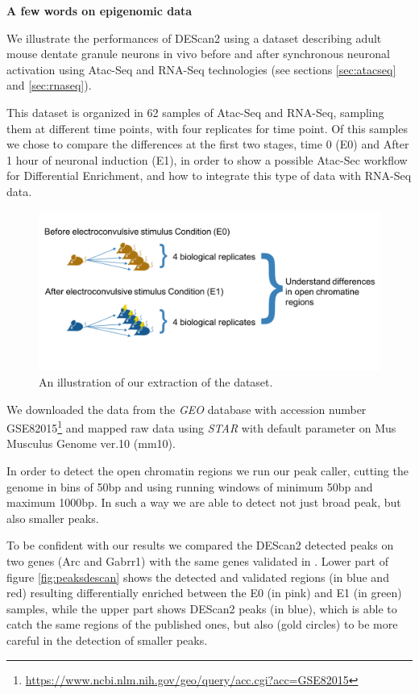 \textbf{A few words on epigenomic data}

We illustrate the performances of DEScan2 using a dataset \cite{Su2017} describing adult mouse dentate granule neurons in vivo before and after synchronous neuronal activation using Atac-Seq and RNA-Seq technologies (see sections \ref{sec:atacseq} and \ref{sec:rnaseq}).

This dataset is organized in 62 samples of Atac-Seq and RNA-Seq, sampling them at different time points, with four replicates for time point.
Of this samples we chose to compare the differences at the first two stages, time 0 (E0) and After 1 hour of neuronal induction (E1), in order to show a possible Atac-Sec workflow for Differential Enrichment, and how to integrate this type of data with RNA-Seq data.

\begin{figure}[H]
\includegraphics[width=\textwidth,height=\textheight,keepaspectratio]{img/descan2/dataset.png}
\caption{An illustration of our extraction of the \cite{Su2017} dataset.}
\label{fig:atacdataset}
\centering
\end{figure}

We downloaded the data from the \textit{GEO} database \cite{Edgar2002, Barrett2013} with accession number GSE82015\footnote{\url{https://www.ncbi.nlm.nih.gov/geo/query/acc.cgi?acc=GSE82015}} and mapped raw data using \textit{STAR} \cite{Dobin2013} with default parameter on Mus Musculus Genome ver.10 (mm10).

In order to detect the open chromatin regions we run our peak caller, cutting the genome in bins of 50bp and using running windows of minimum 50bp and maximum 1000bp. In such a way we are able to detect not just broad peak, but also smaller peaks.

To be confident with our results we compared the DEScan2 detected peaks on two genes (Arc and Gabrr1) with the same genes validated in \cite{Su2017}.
Lower part of figure \ref{fig:peaksdescan} shows the detected and validated regions (in blue and red) resulting differentially enriched between the E0 (in pink) and E1 (in green) samples, while the upper part shows DEScan2 peaks (in blue), which is able to catch the same regions of the published ones, but also (gold circles) to be more careful in the detection of smaller peaks.

